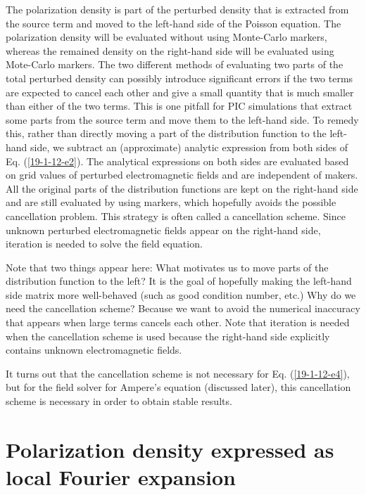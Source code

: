 \documentclass{llncs}
\begin{document}
The polarization density is part of the perturbed density that is extracted
from the source term and moved to the left-hand side of the Poisson equation.
The polarization density will be evaluated without using Monte-Carlo markers,
whereas the remained density on the right-hand side will be evaluated using
Mote-Carlo markers. The two different methods of evaluating two parts of the
total perturbed density can possibly introduce significant errors if the two
terms are expected to cancel each other and give a small quantity that is much
smaller than either of the two terms. This is one pitfall for PIC simulations
that extract some parts from the source term and move them to the left-hand
side. To remedy this, rather than directly moving a part of the distribution
function to the left-hand side, we subtract an (approximate) analytic
expression from both sides of Eq. (\ref{19-1-12-e2}). The analytical
expressions on both sides are evaluated based on grid values of perturbed
electromagnetic fields and are independent of makers. All the original parts
of the distribution functions are kept on the right-hand side and are still
evaluated by using markers, which hopefully avoids the possible cancellation
problem. This strategy is often called a cancellation scheme. Since unknown
perturbed electromagnetic fields appear on the right-hand side, iteration is
needed to solve the field equation.

Note that two things appear here: What motivates us to move parts of the
distribution function to the left? It is the goal of hopefully making the
left-hand side matrix more well-behaved (such as good condition number, etc.)
Why do we need the cancellation scheme? Because we want to avoid the numerical
inaccuracy that appears when large terms cancels each other. Note that
iteration is needed when the cancellation scheme is used because the
right-hand side explicitly contains unknown electromagnetic fields.

It turns out that the cancellation scheme is not necessary for Eq.
(\ref{19-1-12-e4}), but for the field solver for Ampere's equation (discussed
later), this cancellation scheme is necessary in order to obtain stable
results.

\section{Polarization density expressed as local Fourier
expansion}\label{21-8-22-a3}
\end{document}
